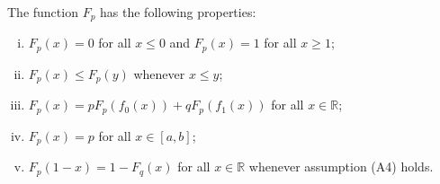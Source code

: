 \documentclass[10pt,a4paper]{amsart}
\begin{document}
\begin{theorem}
\label{theorem:cantor_properties}
The function $F_{p}$ has the following properties:
\begin{enumerate}[(i)]
\item $F_{p}(x) = 0$ for all $x \leq 0$ and $F_{p}(x) = 1$ for all $x \geq 1$;
\item $F_{p}(x) \leq F_p(y)$ whenever $x \leq y$;
\item $F_p(x) = pF_p(f_0(x)) + qF_p(f_1(x))$ for all $x \in \mathbb{R}$;
\item $F_p(x) = p$ for all $x \in [a,b]$;
\item $F_{p}(1-x) = 1-F_{q}(x)$ for all $x \in \mathbb{R}$ whenever assumption (A4) holds.
\end{enumerate}
\end{theorem}
\end{document}
